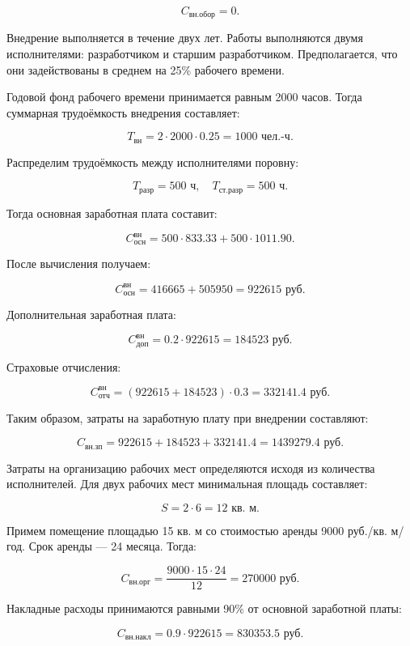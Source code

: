 \[
C_{\text{вн.обор}} = 0.
\]

Внедрение выполняется в течение двух лет. Работы выполняются двумя
исполнителями: разработчиком и старшим разработчиком. Предполагается,
что они задействованы в среднем на 25\% рабочего времени.

Годовой фонд рабочего времени принимается равным 2000 часов. Тогда
суммарная трудоёмкость внедрения составляет:

\[
T_{\text{вн}} = 2 \cdot 2000 \cdot 0.25 = 1000 \text{ чел.-ч}.
\]

Распределим трудоёмкость между исполнителями поровну:

\[
T_{\text{разр}} = 500 \text{ ч}, \quad
T_{\text{ст.разр}} = 500 \text{ ч}.
\]

Тогда основная заработная плата составит:

\[
C_{\text{осн}}^{\text{вн}} =
500 \cdot 833.33 + 500 \cdot 1011.90.
\]

После вычисления получаем:

\[
C_{\text{осн}}^{\text{вн}} =
416665 + 505950 = 922615 \text{ руб.}
\]

Дополнительная заработная плата:

\[
C_{\text{доп}}^{\text{вн}} =
0.2 \cdot 922615 = 184523 \text{ руб.}
\]

Страховые отчисления:

\[
C_{\text{отч}}^{\text{вн}} =
(922615 + 184523)\cdot 0.3 = 332141.4 \text{ руб.}
\]

Таким образом, затраты на заработную плату при внедрении составляют:

\begin{equation}
C_{\text{вн.зп}} =
922615 + 184523 + 332141.4 =
1439279.4 \text{ руб.}
\end{equation}

Затраты на организацию рабочих мест определяются исходя из количества
исполнителей. Для двух рабочих мест минимальная площадь составляет:

\[
S = 2 \cdot 6 = 12 \text{ кв. м}.
\]

Примем помещение площадью 15 кв. м со стоимостью аренды
9000 руб./кв. м/год. Срок аренды — 24 месяца. Тогда:

\[
C_{\text{вн.орг}} =
\frac{9000 \cdot 15 \cdot 24}{12} = 270000 \text{ руб.}
\]

Накладные расходы принимаются равными 90\% от основной заработной
платы:

\begin{equation}
C_{\text{вн.накл}} =
0.9 \cdot 922615 = 830353.5 \text{ руб.}
\end{equation}

